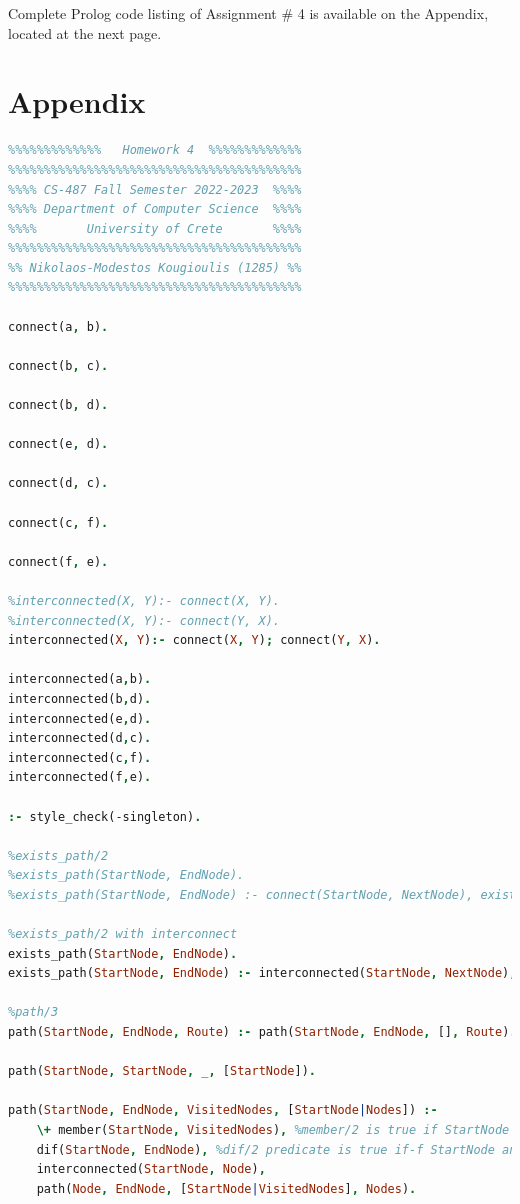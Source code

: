 \documentclass{article}
\begin{document}
Complete Prolog code listing of Assignment \# 4 is available on the Appendix, located at the next page.

\newpage

\section{Appendix}

\appendix

\begin{lstlisting}[language=Prolog, caption=Complete Code Listing]
%%%%%%%%%%%%%%%%%%%%%%%%%%%%%%%%%%%%%%%%%
%%%%%%%%%%%%%   Homework 4  %%%%%%%%%%%%%
%%%%%%%%%%%%%%%%%%%%%%%%%%%%%%%%%%%%%%%%%
%%%% CS-487 Fall Semester 2022-2023  %%%%
%%%% Department of Computer Science  %%%%
%%%%       University of Crete       %%%%
%%%%%%%%%%%%%%%%%%%%%%%%%%%%%%%%%%%%%%%%%
%% Nikolaos-Modestos Kougioulis (1285) %%
%%%%%%%%%%%%%%%%%%%%%%%%%%%%%%%%%%%%%%%%%

connect(a, b).

connect(b, c).

connect(b, d).

connect(e, d).

connect(d, c).

connect(c, f).

connect(f, e).

%interconnected(X, Y):- connect(X, Y).
%interconnected(X, Y):- connect(Y, X).
interconnected(X, Y):- connect(X, Y); connect(Y, X).

interconnected(a,b).
interconnected(b,d).
interconnected(e,d).
interconnected(d,c).
interconnected(c,f).
interconnected(f,e).

:- style_check(-singleton).

%exists_path/2
%exists_path(StartNode, EndNode).
%exists_path(StartNode, EndNode) :- connect(StartNode, NextNode), exists_path(NextNode, EndNode).

%exists_path/2 with interconnect
exists_path(StartNode, EndNode).
exists_path(StartNode, EndNode) :- interconnected(StartNode, NextNode), exists_path(NextNode, EndNode).

%path/3
path(StartNode, EndNode, Route) :- path(StartNode, EndNode, [], Route).

path(StartNode, StartNode, _, [StartNode]).

path(StartNode, EndNode, VisitedNodes, [StartNode|Nodes]) :-
    \+ member(StartNode, VisitedNodes), %member/2 is true if StartNode is member of VisitedNodes list
    dif(StartNode, EndNode), %dif/2 predicate is true if-f StartNode and EndNode are different
    interconnected(StartNode, Node),
    path(Node, EndNode, [StartNode|VisitedNodes], Nodes).


\end{lstlisting}
\end{document}

